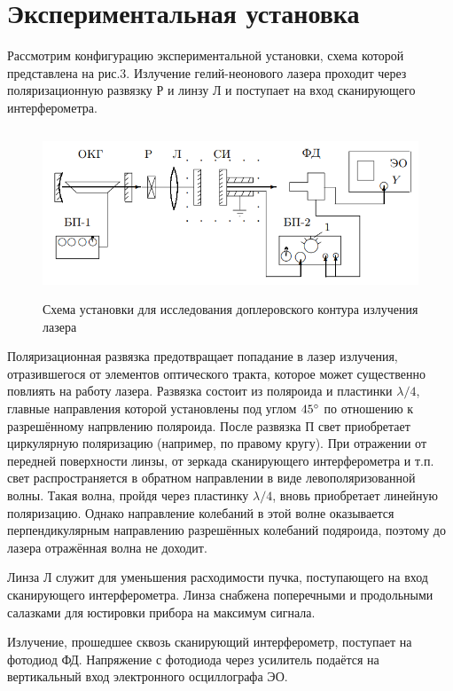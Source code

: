 \documentclass[12pt]{article}
\begin{document}
\section*{Экспериментальная установка}
\par
	Рассмотрим конфигурацию экспериментальной установки, схема которой представлена на рис.3. Излучение гелий-неонового лазера проходит через поляризационную развязку Р и линзу Л и поступает на вход сканирующего интерферометра.
\begin{figure}[h!]
	\centering
	\includegraphics[width = 12cm, height = 5cm]{image3.png}
	\caption{Схема установки для исследования доплеровского контура излучения лазера}
\end{figure}
\par
	Поляризационная развязка предотвращает попадание в лазер излучения, отразившегося от элементов оптического тракта, которое может существенно повлиять на работу лазера. Развязка состоит из поляроида и пластинки $\lambda / 4$, главные направления которой установлены под углом $45 \degree$ по отношению к разрешённому напрвлению поляроида. После развязка П свет приобретает циркулярную поляризацию (например, по правому кругу). При отражении от передней поверхности линзы, от зеркада сканирующего интерферометра и т.п. свет распространяется в обратном направлении в виде левополяризованной волны. Такая волна, пройдя через пластинку $\lambda / 4$, вновь приобретает линейную поляризацию. Однако направление колебаний в этой волне оказывается перпендикулярным направлению разрешённых колебаний подяроида, поэтому до лазера отражённая волна не доходит.
\par
	Линза Л служит для уменьшения расходимости пучка, поступающего на вход сканирующего интерферометра. Линза снабжена поперечными и продольными салазками для юстировки прибора на максимум сигнала.
\par
	Излучение, прошедшее сквозь сканирующий интерферометр, поступает на фотодиод ФД. Напряжение с фотодиода через усилитель подаётся на вертикальный вход электронного осциллографа ЭО.	
\end{document}

